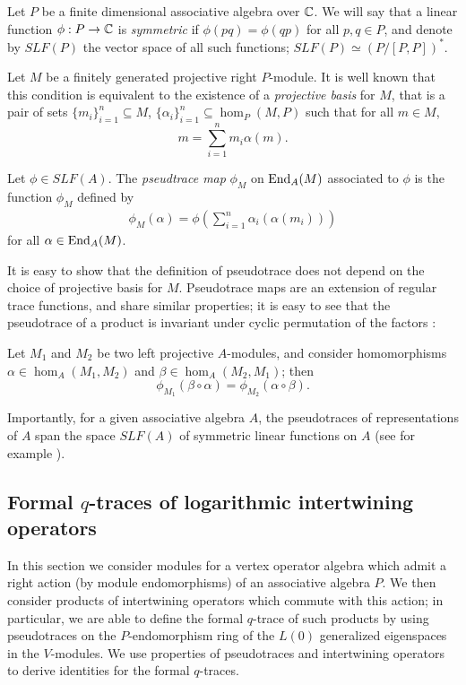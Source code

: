 \documentclass[12pt]{article}
\begin{document}
Let $P$ be a finite dimensional associative algebra over $\mathbb{C}$.
We will say that a linear function $\phi: P\rightarrow \mathbb{C}$ is \emph{symmetric}
if  $\phi(pq) = \phi(qp)$ for all $p,q\in P$, and denote by $SLF(P)$ the
vector space of all such functions; $SLF(P)\simeq \left(P/[P,P]\right)^*$.

Let $M$ be a finitely generated projective right $P$-module. 
It is well known that this condition is equivalent to the existence of a
\emph{projective basis} for $M$, that is
a pair of sets $\{m_i\}_{i=1}^n\subseteq M$,
$\{\alpha_i\}_{i=1}^n\subseteq \hom_P(M, P)$
such that for all $m\in M$, $$m = \sum_{i=1}^n m_i\alpha(m).$$ 

\begin{defn}{\rm Let $\phi \in SLF(A)$.
    The \emph{pseudtrace map} $\phi_M$ on $\mathrm{End}_A(M)$ associated to $\phi$
    is the function $\phi_M$ defined by
\begin{align*}
  \phi_M(\alpha) = \phi\left(\sum_{i=1}^n \alpha_i(\alpha(m_i))\right)
\end{align*}
for all $\alpha \in \mathrm{End}_A(M)$.
}
\end{defn}
It is easy to show that the definition of pseudotrace does not depend
on the choice of projective basis for $M$.
Pseudotrace maps are an extension of regular trace functions, and share similar
properties; it is easy to see that the pseudotrace of a product is invariant under
cyclic permutation of the factors \cite{AN}:

\begin{prop}
  Let $M_1$ and $M_2$ be two left projective $A$-modules, and consider
  homomorphisms
  $\alpha \in \hom_A(M_1,M_2)$ and $\beta \in \hom_A(M_2,M_1)$; then
  $$
    \phi_{M_1} (\beta \circ \alpha) =
    \phi_{M_2} (\alpha \circ \beta).
  $$
\end{prop}

Importantly, for a given associative algebra $A$, the pseudotraces of
representations of $A$ span the space $SLF(A)$ of symmetric linear functions
on $A$ (see for example \cite{Ar, Miy2}).

\subsection{Formal $q$-traces of logarithmic intertwining operators}
\label{s-formal-traces}

In this section we consider modules for a vertex operator algebra
which admit a right action (by module endomorphisms) of an associative
algebra $P$. We then consider products of intertwining operators which
commute with this action; in particular, we are able to define the formal
$q$-trace of such products by using pseudotraces on the $P$-endomorphism
ring of the $L(0)$ generalized eigenspaces in the $V$-modules.
We use properties of pseudotraces and intertwining operators to derive
identities for the formal $q$-traces.
\end{document}
